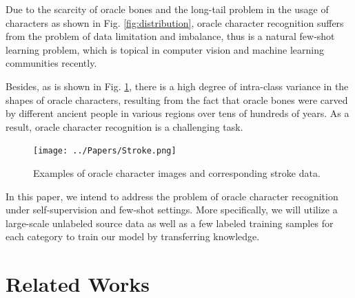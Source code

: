 \documentclass{article}
\begin{document}
Due to the scarcity of oracle bones and the long-tail problem in the usage of characters as shown in Fig. \ref{fig:distribution}, oracle character recognition suffers from the problem of data limitation and imbalance, thus is a natural few-shot learning problem, which is topical in computer vision and machine learning communities recently. 

Besides, as is shown in Fig. \ref{fig:stroke}, there is a high degree of intra-class variance in the shapes of oracle characters, resulting from the fact that oracle bones were carved by different ancient people in various regions over tens of hundreds of years. As a result, oracle character recognition is a challenging task.

\begin{figure}[t]
	\centering
	\texttt{[image: ../Papers/Stroke.png]}
	\caption{Examples of oracle character images and corresponding stroke data.}
	\label{fig:stroke}
\end{figure}

In this paper, we intend to address the problem of oracle character recognition under self-supervision and few-shot settings. More specifically, we will utilize a large-scale unlabeled source data as well as a few labeled training samples for each category to train our model by transferring knowledge.

\section{Related Works}
\label{sec:related}
\end{document}
